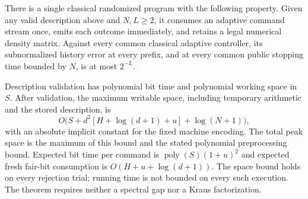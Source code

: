 \begin{theorem}\label{thm:uniformchoi66}
There is a single classical randomized program with the following
property. Given any valid description above and $N,L\ge2$, it consumes
an adaptive command stream once, emits each outcome immediately, and
retains a legal numerical density matrix. Against every common
classical adaptive controller, its subnormalized history error at
every prefix, and at every common public stopping time bounded by
$N$, is at most $2^{-L}$.

Description validation has polynomial bit time and polynomial working
space in $S$. After validation, the maximum writable space, including
temporary arithmetic and the stored description, is
\begin{equation}\label{eq:uniformspace66}
 O\bigl(S+d^2[H+\log(d+1)+u]+\log(N+1)\bigr),
\end{equation}
with an absolute implicit constant for the fixed machine encoding.
The total peak space is the maximum of this bound and the stated
polynomial preprocessing bound. Expected bit time per command is
$\operatorname{poly}(S)(1+u)^2$ and expected fresh fair-bit consumption
is $O(H+u+\log(d+1))$. The space bound holds on every rejection trial;
running time is not bounded on every such execution. The theorem
requires neither a spectral gap nor a Kraus factorization.
\end{theorem}
